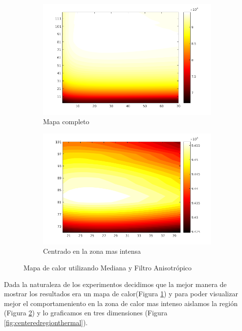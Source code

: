 \begin{figure}[H]
	\centering
	\begin{subfigure}[b]{0.48\textwidth}
        \includegraphics[width=1\textwidth]{./Figures/AllDataThermalAnisodiff.png}
        \caption{Mapa completo}
        \label{fig:thermalforanisodiffwithmediana}
  \end{subfigure}
  \begin{subfigure}[b]{0.48\textwidth}
        \includegraphics[width=1\textwidth]{./Figures/CenteredThermalAnisodiff.png}
        \caption{Centrado en la zona mas intensa}
        \label{fig:thermalforanisodiffwithmedianacentered}
  \end{subfigure}
	\label{fig:thermalfigure}
	\caption{Mapa de calor utilizando Mediana y Filtro Anisotr\'opico}
\end{figure}

Dada la naturaleza de los experimentos decidimos que la mejor manera de mostrar los resultados era un mapa de calor(Figura \ref{fig:thermalforanisodiffwithmediana}) y para poder visualizar mejor el comportameniento en la zona de calor mas intenso aislamos la regi\'on (Figura \ref{fig:thermalforanisodiffwithmedianacentered}) y lo graficamos en tres dimensiones (Figura \ref{fig:centeredregionthermal}).\\

